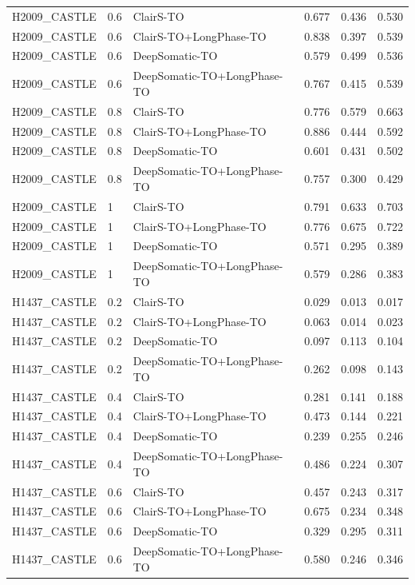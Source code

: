 \documentclass[pdflatex,sn-nature]{sn-jnl}
\begin{document}
{\begin{longtable}{@{}lllccc@{}}
  H2009\_CASTLE & 0.6 & ClairS-TO & 0.677 & 0.436 & 0.530 \\
  H2009\_CASTLE & 0.6 & ClairS-TO+LongPhase-TO & 0.838 & 0.397 & 0.539 \\
  H2009\_CASTLE & 0.6 & DeepSomatic-TO & 0.579 & 0.499 & 0.536 \\
  H2009\_CASTLE & 0.6 & DeepSomatic-TO+LongPhase-TO & 0.767 & 0.415 & 0.539 \\
  H2009\_CASTLE & 0.8 & ClairS-TO & 0.776 & 0.579 & 0.663 \\
  H2009\_CASTLE & 0.8 & ClairS-TO+LongPhase-TO & 0.886 & 0.444 & 0.592 \\
  H2009\_CASTLE & 0.8 & DeepSomatic-TO & 0.601 & 0.431 & 0.502 \\
  H2009\_CASTLE & 0.8 & DeepSomatic-TO+LongPhase-TO & 0.757 & 0.300 & 0.429 \\
  H2009\_CASTLE & 1 & ClairS-TO & 0.791 & 0.633 & 0.703 \\
  H2009\_CASTLE & 1 & ClairS-TO+LongPhase-TO & 0.776 & 0.675 & 0.722 \\
  H2009\_CASTLE & 1 & DeepSomatic-TO & 0.571 & 0.295 & 0.389 \\
  H2009\_CASTLE & 1 & DeepSomatic-TO+LongPhase-TO & 0.579 & 0.286 & 0.383 \\
  \addlinespace
  H1437\_CASTLE & 0.2 & ClairS-TO & 0.029 & 0.013 & 0.017 \\
  H1437\_CASTLE & 0.2 & ClairS-TO+LongPhase-TO & 0.063 & 0.014 & 0.023 \\
  H1437\_CASTLE & 0.2 & DeepSomatic-TO & 0.097 & 0.113 & 0.104 \\
  H1437\_CASTLE & 0.2 & DeepSomatic-TO+LongPhase-TO & 0.262 & 0.098 & 0.143 \\
  H1437\_CASTLE & 0.4 & ClairS-TO & 0.281 & 0.141 & 0.188 \\
  H1437\_CASTLE & 0.4 & ClairS-TO+LongPhase-TO & 0.473 & 0.144 & 0.221 \\
  H1437\_CASTLE & 0.4 & DeepSomatic-TO & 0.239 & 0.255 & 0.246 \\
  H1437\_CASTLE & 0.4 & DeepSomatic-TO+LongPhase-TO & 0.486 & 0.224 & 0.307 \\
  H1437\_CASTLE & 0.6 & ClairS-TO & 0.457 & 0.243 & 0.317 \\
  H1437\_CASTLE & 0.6 & ClairS-TO+LongPhase-TO & 0.675 & 0.234 & 0.348 \\
  H1437\_CASTLE & 0.6 & DeepSomatic-TO & 0.329 & 0.295 & 0.311 \\
  H1437\_CASTLE & 0.6 & DeepSomatic-TO+LongPhase-TO & 0.580 & 0.246 & 0.346 \\

\end{longtable}}
\end{document}
